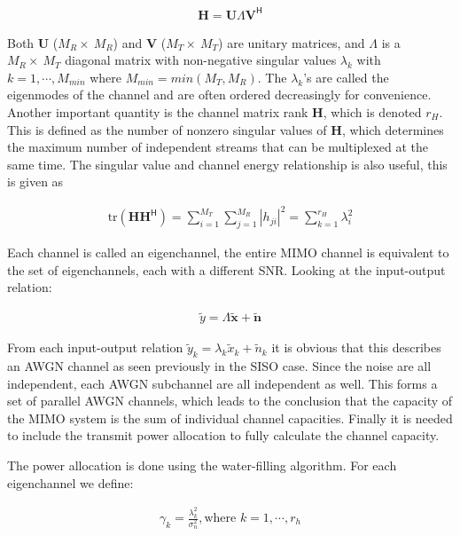 \begin{align*}
  \mathbf{H} = \mathbf{U} \Lambda \mathbf{V}^{\mathsf{H}} 
\end{align*}
 
Both $\mathbf{U}$ ($M_R \times \ M_R$) and $\mathbf{V}$ ($M_T \times \ M_T$) are unitary matrices, and $\Lambda$ is a  $M_R \times \ M_T$ diagonal matrix with non-negative singular values $\lambda_k$ with $k=1, \cdots, M_{min}$ where $M_{min} = min(M_T,M_R)$. The $\lambda_k$'s are called the eigenmodes of the channel and are often ordered decreasingly for convenience.
Another important quantity is the channel matrix rank $\mathbf{H}$, which is denoted $r_H$. This is defined as the number of nonzero singular values of $\mathbf{H}$, which determines the maximum number of independent streams that can be multiplexed at the same time\cite{Tim2012Practical}. The singular value and channel energy relationship is also useful, this is given as 

\begin{align*}
  \text{tr}(\mathbf{H} \mathbf{H}^{\mathsf{H}}) = \sum_{i=1}^{M_T} \sum_{j=1}^{M_R} |h_{ji}|^2 = \sum_{k=1}^{r_H} \lambda_i^2
\end{align*}

Each channel is called an eigenchannel, the entire MIMO channel is equivalent to the set of eigenchannels, each with a different SNR. Looking at the input-output relation\cite{Tim2012Practical}:

\begin{align*}
  \tilde{y} = \Lambda\mathbf{ \tilde{x}} + \mathbf{\tilde{n}}
\end{align*}

From each input-output relation $\tilde{y}_k = \lambda_k \tilde{x}_k + \tilde{n}_k$ it is obvious that this describes an AWGN channel as seen previously in the SISO case. Since the noise are all independent, each AWGN subchannel are all independent as well. This forms a set of parallel AWGN channels, which leads to the conclusion that the capacity of the MIMO system is the sum of individual channel capacities. Finally it is needed to include the transmit power allocation to fully calculate the channel capacity.


The power allocation is done using the water-filling algorithm\cite{Tim2012Practical}. For each eigenchannel we define: 

\begin{align*}
  \gamma_k = \frac{\lambda_k^2}{\sigma_n^2}, \text{where } k = 1, \cdots, r_h
\end{align*}

